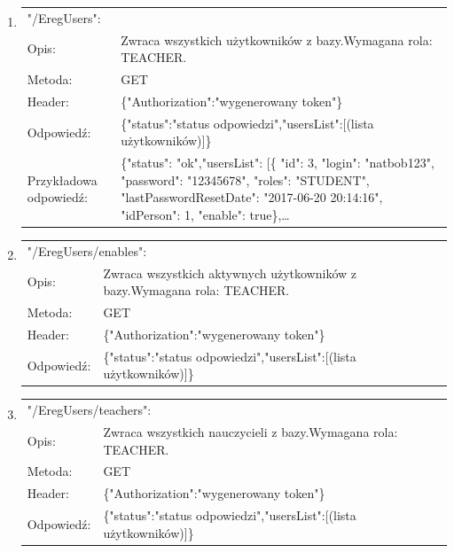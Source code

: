 \documentclass[12pt, titlepage]{article}
\begin{document}
\begin{enumerate}

	\item
	{\renewcommand{\arraystretch}{1.5}
	\begin{tabular}[t]{p{3cm} p{15cm}}
	\multicolumn{2}{l}{"/EregUsers":} \\
	Opis: &  Zwraca wszystkich użytkowników z bazy.\newline Wymagana rola: TEACHER. \\
	Metoda: & GET \\
	Header: & \{"Authorization":"wygenerowany token"\} \\
	Odpowiedź: & \{"status":"status odpowiedzi",\newline "usersList":[(lista użytkowników)]\} \\
	Przykładowa \newline odpowiedź: & 			\{"status": "ok",\newline "usersList": [\newline \{ "id": 3,\newline
            "login": "natbob123",\newline
            "password": "12345678",\newline
            "roles": "STUDENT",\newline
            "lastPasswordResetDate": "2017-06-20 20:14:16",\newline
            "idPerson": 1,\newline
            "enable": true\},\newline \ldots
	\end{tabular}}
	
	\item
	{\renewcommand{\arraystretch}{1.5}
	\begin{tabular}[t]{p{3cm} p{15cm}}
	\multicolumn{2}{l}{"/EregUsers/enables":} \\
	Opis: &  Zwraca wszystkich aktywnych użytkowników z bazy.\newline Wymagana rola: TEACHER. \\
	Metoda: & GET \\
	Header: & \{"Authorization":"wygenerowany token"\} \\
	Odpowiedź: & \{"status":"status odpowiedzi",\newline "usersList":[(lista użytkowników)]\}
	\end{tabular}}
	
	\item
	{\renewcommand{\arraystretch}{1.5}
	\begin{tabular}[t]{p{3cm} p{15cm}}
	\multicolumn{2}{l}{"/EregUsers/teachers":} \\
	Opis: &  Zwraca wszystkich nauczycieli z bazy.\newline Wymagana rola: TEACHER. \\
	Metoda: & GET \\
	Header: & \{"Authorization":"wygenerowany token"\} \\
	Odpowiedź: & \{"status":"status odpowiedzi",\newline "usersList":[(lista użytkowników)]\} 
	\end{tabular}}
	

\end{enumerate}
\end{document}
